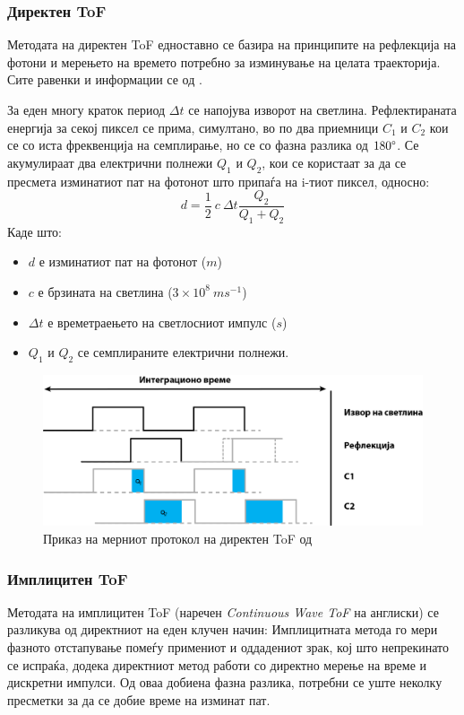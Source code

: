 \documentclass[12pt]{article}
\begin{document}
	  \subsubsection{Директен ToF}
		Методата на директен ToF едноставно се базира на принципите на рефлекција на фотони и мерењето на времето потребно за изминување на целата траекторија. Сите равенки и информации се од \cite{tofwhitepaper}.

		За еден многу краток период $ \Delta t $ се напојува изворот на светлина. Рефлектираната енергија за секој пиксел се прима, симултано, во по два приемници $C_1$ и $C_2$ кои се со иста фреквенција на семплирање, но се со фазна разлика од $180 \degree$. Се акумулираат два електрични полнежи $Q_1$ и  $Q_2$, кои се користаат за да се пресмета изминатиот пат на фотонот што припаѓа на i-тиот пиксел, односно:
		$$ d = \frac{1}{2} \ c\  \Delta t \frac{Q_2}{Q_1 + Q_2} $$
		Каде што:
		\begin{itemize}
			\item $d$ е изминатиот пат на фотонот ($m$)
			\item $c$ е брзината на светлина ($ 3 \times 10^8\ ms^{-1} $)
			\item $\Delta t$ е времетраењето на светлосниот импулс ($s$)
			\item $Q_1$ и $Q_2$ се семплираните електрични полнежи.
			\end{itemize}

		\begin{figure}[H]
			\includegraphics[width=0.75\linewidth]{./images/impulseToF.png}
			\centering
			\caption{Приказ на мерниот протокол на директен ToF од \cite{tofwhitepaper}}
			\label{fig:impulseToF.png}
			\end{figure}

	     \subsubsection{Имплицитен ToF}
		Методата на имплицитен ToF (наречен \textit{Continuous Wave ToF} на англиски) се разликува од директниот на еден клучен начин: Имплицитната метода го мери фазното отстапување помеѓу примениот и оддадениот зрак, кој што непрекинато се испраќа, додека директниот метод работи со директно мерење на време и дискретни импулси. Од оваа добиена фазна разлика, потребни се уште неколку пресметки за да се добие време на изминат пат.
\end{document}
